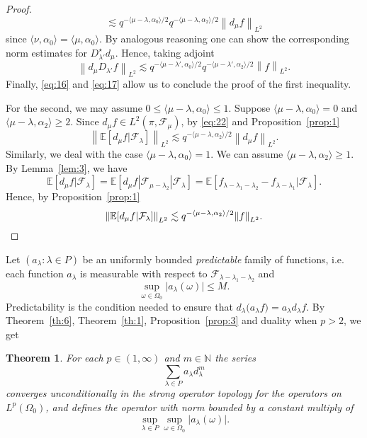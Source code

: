 \documentclass[a4paper]{amsart}
\newcommand{\sprod}[2]{{\langle #1, #2\rangle}}
\newcommand{\norm}[1]{{\left\lVert #1 \right\rVert}}
\newcommand{\abs}[1]{{\lvert {#1} \rvert}}
\newcommand{\seq}[2]{\left({#1}: {#2}\right)}
\newcommand{\EE}{\mathbb{E}}
\newcommand{\NN}{\mathbb{N}}
\theoremstyle{plain}
\newtheorem{theorem}{Theorem}
\theoremstyle{definition}
\theoremstyle{remark}
\numberwithin{equation}{section}
\theoremstyle{plain}
\begin{document}
\begin{proof}
\begin{equation}
		\lesssim 
		q^{-\sprod{\mu - \lambda}{\alpha_0}/2}
		q^{-\sprod{\mu - \lambda}{\alpha_2}/2} 
		\norm{d_\mu f}_{L^2}
	\end{equation}
	since $\sprod{\nu}{\alpha_0} = \sprod{\mu}{\alpha_0}$. By analogous reasoning one can show the corresponding
	norm estimates for $D_{\lambda'}^\star d_\mu$. Hence, taking adjoint
	\begin{equation}
		\label{eq:17}
		\norm{d_\mu D_{\lambda'} f}_{L^2} 
		\lesssim 
		q^{-\sprod{\mu - \lambda'}{\alpha_0}/2} 
		q^{-\sprod{\mu - \lambda'}{\alpha_2}/2} 
		\norm{f}_{L^2}.
	\end{equation}
	Finally, \eqref{eq:16} and \eqref{eq:17} allow us to conclude the proof of the first
	inequality.

	For the second, we may assume $0 \leq \sprod{\mu - \lambda}{\alpha_0} \leq 1$. Suppose 
	$\sprod{\mu - \lambda}{\alpha_0} = 0$ and 
	$\sprod{\mu - \lambda}{\alpha_2} \geq 2$. Since 
	$d_\mu f \in L^2(\pi, \mathcal{F}_\mu)$, by \eqref{eq:22} and Proposition~\ref{prop:1}
	$$
	\norm{\EE[d_\mu f| \mathcal{F}_\lambda]}_{L^2} 
	\lesssim 
	q^{-\sprod{\mu - \lambda}{\alpha_2}/2} 
	\norm{d_\mu f}_{L^2}.
	$$
	Similarly, we deal with the case $\sprod{\mu - \lambda}{\alpha_0} = 1$. We can assume 
	$\sprod{\mu - \lambda}{\alpha_2} \geq 1$. By Lemma~\ref{lem:3}, we have 
	$$
	\EE[d_\mu f | \mathcal{F}_\lambda] 
	= \EE[d_\mu f | \mathcal{F}_{\mu-\lambda_2} | \mathcal{F}_\lambda]
	= \EE[f_{\lambda-\lambda_1-\lambda_2} - f_{\lambda-\lambda_1} | \mathcal{F}_\lambda].
	$$
	Hence, by Proposition~\ref{prop:1}
	\[
	\norm{\EE[d_\mu f| \mathcal{F}_\lambda]}_{L^2} 
	\lesssim 
	q^{-\sprod{\mu - \lambda}{\alpha_2}/2} \norm{f}_{L^2}. 
	\qedhere
	\]
\end{proof}

Let $\seq{a_\lambda}{\lambda \in P}$ be an uniformly bounded \emph{predictable} family of
functions, i.e. each function $a_\lambda$ is measurable with respect to $\mathcal{F}_{\lambda-\lambda_1-\lambda_2}$ and
$$
\sup_{\omega \in \Omega_0} \abs{a_\lambda(\omega)} \leq M.
$$
Predictability is the condition needed to ensure that 
$d_\lambda \big(a_\lambda f\big) = a_\lambda d_\lambda f$. By Theorem~\ref{th:6},
Theorem~\ref{th:1}, Proposition~\ref{prop:3} and duality when $p > 2$, we get
\begin{theorem}
	\label{th:4}
	For each $p \in (1, \infty)$ and $m \in \NN$ the series
	$$
	\sum_{\lambda \in P} a_\lambda d_\lambda^m
	$$
	converges unconditionally in the strong operator topology for the operators on $L^p(\Omega_0)$, and
	defines the operator with norm bounded by a constant multiply of
	$$
	\sup_{\lambda \in P} \sup_{\omega \in \Omega_0} \abs{a_\lambda(\omega)}.
	$$
\end{theorem}
\end{document}
